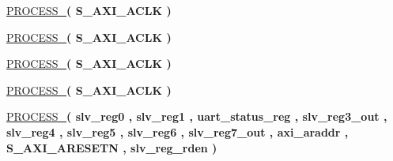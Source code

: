 \begin{DoxyCompactItemize}
\hyperlink{classUART__v1__0__S00__AXI_1_1arch__imp_acf9a8d423319c94928908546cd66d779}{P\+R\+O\+C\+E\+S\+S\+\_}{\bfseries  ( {\bfseries \textcolor{vhdlchar}{S\+\_\+\+A\+X\+I\+\_\+\+A\+C\+LK}\textcolor{vhdlchar}{ }} )}
\item 
\mbox{\label{classUART__v1__0__S00__AXI_1_1arch__imp_a46ef74882494d566c9af5b92859df7f8}} 
\hyperlink{classUART__v1__0__S00__AXI_1_1arch__imp_a46ef74882494d566c9af5b92859df7f8}{P\+R\+O\+C\+E\+S\+S\+\_}{\bfseries  ( {\bfseries \textcolor{vhdlchar}{S\+\_\+\+A\+X\+I\+\_\+\+A\+C\+LK}\textcolor{vhdlchar}{ }} )}
\item 
\mbox{\label{classUART__v1__0__S00__AXI_1_1arch__imp_a540733a9d881f3739d4b074f82493696}} 
\hyperlink{classUART__v1__0__S00__AXI_1_1arch__imp_a540733a9d881f3739d4b074f82493696}{P\+R\+O\+C\+E\+S\+S\+\_}{\bfseries  ( {\bfseries \textcolor{vhdlchar}{S\+\_\+\+A\+X\+I\+\_\+\+A\+C\+LK}\textcolor{vhdlchar}{ }} )}
\item 
\mbox{\label{classUART__v1__0__S00__AXI_1_1arch__imp_af63a9d34999cb0a12e3012f5d6afbbfc}} 
\hyperlink{classUART__v1__0__S00__AXI_1_1arch__imp_af63a9d34999cb0a12e3012f5d6afbbfc}{P\+R\+O\+C\+E\+S\+S\+\_}{\bfseries  ( {\bfseries \textcolor{vhdlchar}{S\+\_\+\+A\+X\+I\+\_\+\+A\+C\+LK}\textcolor{vhdlchar}{ }} )}
\item 
\mbox{\label{classUART__v1__0__S00__AXI_1_1arch__imp_ac00102850623a2fb02531f06a51c6401}} 
\hyperlink{classUART__v1__0__S00__AXI_1_1arch__imp_ac00102850623a2fb02531f06a51c6401}{P\+R\+O\+C\+E\+S\+S\+\_}{\bfseries  ( {\bfseries \textcolor{vhdlchar}{slv\+\_\+reg0}\textcolor{vhdlchar}{ }} , {\bfseries \textcolor{vhdlchar}{slv\+\_\+reg1}\textcolor{vhdlchar}{ }} , {\bfseries \textcolor{vhdlchar}{uart\+\_\+status\+\_\+reg}\textcolor{vhdlchar}{ }} , {\bfseries \textcolor{vhdlchar}{slv\+\_\+reg3\+\_\+out}\textcolor{vhdlchar}{ }} , {\bfseries \textcolor{vhdlchar}{slv\+\_\+reg4}\textcolor{vhdlchar}{ }} , {\bfseries \textcolor{vhdlchar}{slv\+\_\+reg5}\textcolor{vhdlchar}{ }} , {\bfseries \textcolor{vhdlchar}{slv\+\_\+reg6}\textcolor{vhdlchar}{ }} , {\bfseries \textcolor{vhdlchar}{slv\+\_\+reg7\+\_\+out}\textcolor{vhdlchar}{ }} , {\bfseries \textcolor{vhdlchar}{axi\+\_\+araddr}\textcolor{vhdlchar}{ }} , {\bfseries \textcolor{vhdlchar}{S\+\_\+\+A\+X\+I\+\_\+\+A\+R\+E\+S\+E\+TN}\textcolor{vhdlchar}{ }} , {\bfseries \textcolor{vhdlchar}{slv\+\_\+reg\+\_\+rden}\textcolor{vhdlchar}{ }} )}

\end{DoxyCompactItemize}
